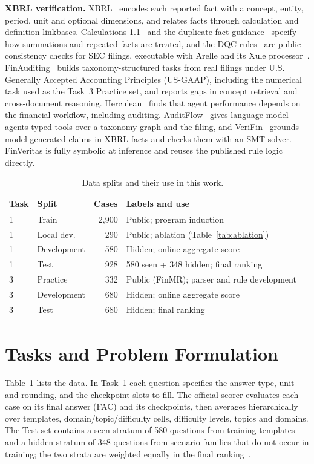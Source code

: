 \documentclass[conference]{IEEEtran}
\begin{document}
\textbf{XBRL verification.} XBRL~\cite{xbrl21} encodes each reported fact with a concept, entity, period, unit and optional dimensions, and relates facts through calculation and definition linkbases. Calculations 1.1~\cite{xbrlcalc11} and the duplicate-fact guidance~\cite{xbrlduplicates} specify how summations and repeated facts are treated, and the DQC rules~\cite{dqcrules} are public consistency checks for SEC filings, executable with Arelle and its Xule processor~\cite{arelle}. FinAuditing~\cite{wang2026finauditing} builds taxonomy-structured tasks from real filings under U.S. Generally Accepted Accounting Principles (US-GAAP), including the numerical task used as the Task~3 Practice set, and reports gaps in concept retrieval and cross-document reasoning. Herculean~\cite{peng2026herculeanagenticbenchmarkfinancial} finds that agent performance depends on the financial workflow, including auditing. AuditFlow~\cite{wang2026auditflow} gives language-model agents typed tools over a taxonomy graph and the filing, and VeriFin~\cite{hall2026verifin} grounds model-generated claims in XBRL facts and checks them with an SMT solver. FinVeritas is fully symbolic at inference and reuses the published rule logic directly.

\begin{table}[t]
\caption{Data splits and their use in this work.}
\label{tab:data}
\centering\footnotesize
\setlength{\tabcolsep}{3pt}
\begin{tabular}{@{}llrp{}@{}}
\toprule
Task & Split & Cases & Labels and use\\
\midrule
1 & Train & 2,900 & Public; program induction\\
1 & Local dev. & 290 & Public; ablation (Table~\ref{tab:ablation})\\
1 & Development & 580 & Hidden; online aggregate score\\
1 & Test & 928 & 580 seen + 348 hidden; final ranking\\
3 & Practice & 332 & Public (FinMR); parser and rule development\\
3 & Development & 680 & Hidden; online aggregate score\\
3 & Test & 680 & Hidden; final ranking\\
\bottomrule
\end{tabular}
\end{table}

\section{Tasks and Problem Formulation}
Table~\ref{tab:data} lists the data. In Task~1 each question specifies the answer type, unit and rounding, and the checkpoint slots to fill. The official scorer evaluates each case on its final answer (FAC) and its checkpoints, then averages hierarchically over templates, domain/topic/difficulty cells, difficulty levels, topics and domains. The Test set contains a seen stratum of 580 questions from training templates and a hidden stratum of 348 questions from scenario families that do not occur in training; the two strata are weighted equally in the final ranking~\cite{cupterms}.
\end{document}
